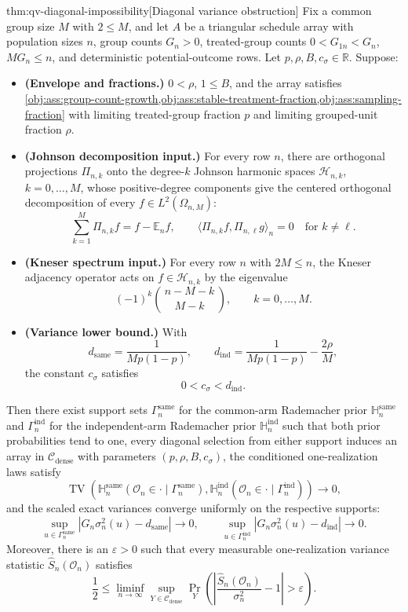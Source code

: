 \begin{theoremv}{thm:qv-diagonal-impossibility}[Diagonal variance obstruction]
Fix a common group size \(M\) with \(2\le M\), and let \(A\) be a triangular schedule array with population sizes \(n\), group counts \(G_n>0\), treated-group counts \(0<G_{1n}<G_n\), \(M G_n\le n\), and deterministic potential-outcome rows.  Let \(p,\rho,B,c_\sigma\in\mathbb R\).  Suppose:
\begin{itemize}
\item \textbf{(Envelope and fractions.)} \(0<\rho\), \(1\le B\), and the array satisfies \cref{obj:ass:group-count-growth,obj:ass:stable-treatment-fraction,obj:ass:sampling-fraction} with limiting treated-group fraction \(p\) and limiting grouped-unit fraction \(\rho\).
\item \textbf{(Johnson decomposition input.)} For every row \(n\), there are orthogonal projections \(\Pi_{n,k}\) onto the degree-\(k\) Johnson harmonic spaces \(\mathcal H_{n,k}\), \(k=0,\ldots,M\), whose positive-degree components give the centered orthogonal decomposition of every \(f\in L^2(\Omega_{n,M})\):
\[
\sum_{k=1}^{M}\Pi_{n,k}f
=
f-\mathbb E_n f,
\qquad
\langle \Pi_{n,k}f,\Pi_{n,\ell}g\rangle_n=0
\quad\text{for }k\ne \ell .
\]
\item \textbf{(Kneser spectrum input.)} For every row \(n\) with \(2M\le n\), the Kneser adjacency operator acts on \(f\in\mathcal H_{n,k}\) by the eigenvalue
\[
(-1)^k {\,n-M-k\,\choose\, M-k\,},
\qquad k=0,\ldots,M .
\]
\item \textbf{(Variance lower bound.)} With
\[
d_{\mathrm{same}}=\frac{1}{M p(1-p)},
\qquad
d_{\mathrm{ind}}=\frac{1}{M p(1-p)}-\frac{2\rho}{M},
\]
the constant \(c_\sigma\) satisfies
\[
0<c_\sigma<d_{\mathrm{ind}} .
\]
\end{itemize}
Then there exist support sets \(\Gamma_n^{\mathrm{same}}\) for the common-arm Rademacher prior \(\mathbb H_n^{\mathrm{same}}\) and \(\Gamma_n^{\mathrm{ind}}\) for the independent-arm Rademacher prior \(\mathbb H_n^{\mathrm{ind}}\) such that both prior probabilities tend to one, every diagonal selection from either support induces an array in \(\mathcal C_{\mathrm{dense}}\) with parameters \((p,\rho,B,c_\sigma)\), the conditioned one-realization laws satisfy
\[
\operatorname{TV}\!\left(
\mathbb H_n^{\mathrm{same}}(\mathcal O_n\in\cdot\mid \Gamma_n^{\mathrm{same}}),
\mathbb H_n^{\mathrm{ind}}(\mathcal O_n\in\cdot\mid \Gamma_n^{\mathrm{ind}})
\right)\to 0,
\]
and the scaled exact variances converge uniformly on the respective supports:
\[
\sup_{u\in\Gamma_n^{\mathrm{same}}}
\left|G_n\sigma_n^2(u)-d_{\mathrm{same}}\right|\to 0,
\qquad
\sup_{u\in\Gamma_n^{\mathrm{ind}}}
\left|G_n\sigma_n^2(u)-d_{\mathrm{ind}}\right|\to 0 .
\]
Moreover, there is an \(\varepsilon>0\) such that every measurable one-realization variance statistic \(\widehat S_n(\mathcal O_n)\) satisfies
\[
\frac12
\le
\liminf_{n\to\infty}
\sup_{Y\in\mathcal C_{\mathrm{dense}}}
\Pr_Y\!\left(
\left|
\frac{\widehat S_n(\mathcal O_n)}{\sigma_n^2}-1
\right|>\varepsilon
\right).
\]
\end{theoremv}

